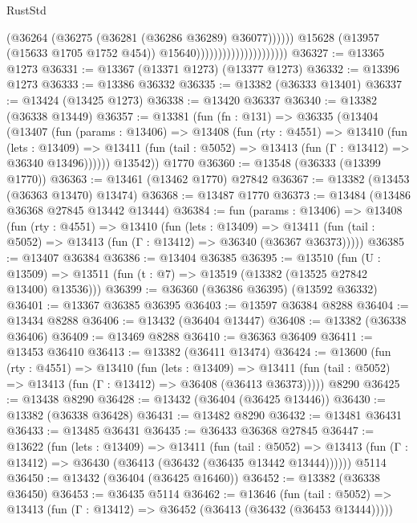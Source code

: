 \begin{lexlean}{RustStd}
\begin{coremodule}
                                                    (@36264
                                                      (@36275 (@36281 (@36286 @36289) @36077))))))
                                              @15628
                                              (@13957 (@15633 @1705 @1752 @454))
                                              @15640)))))))))))))))))))))
@36327 := @13365 @1273
@36331 := @13367 (@13371 @1273) (@13377 @1273)
@36332 := @13396 @1273
@36333 := @13386 @36332
@36335 := @13382 (@36333 @13401)
@36337 := @13424 (@13425 @1273)
@36338 := @13420 @36337
@36340 := @13382 (@36338 @13449)
@36357 := @13381
    (fun (fn : @131) =>
    @36335
      (@13404
        (@13407
          (fun (params : @13406) =>
          @13408
            (fun (rty : @4551) =>
            @13410
              (fun (lets : @13409) =>
              @13411 (fun (tail : @5052) => @13413 (fun (Γ : @13412) => @36340 @13496))))))
        @13542))
    @1770
@36360 := @13548 (@36333 (@13399 @1770))
@36363 := @13461 (@13462 @1770) @27842
@36367 := @13382 (@13453 (@36363 @13470) @13474)
@36368 := @13487 @1770
@36373 := @13484 (@13486 @36368 @27845 @13442 @13444)
@36384 := fun (params : @13406) =>
  @13408
    (fun (rty : @4551) =>
    @13410
      (fun (lets : @13409) =>
      @13411 (fun (tail : @5052) => @13413 (fun (Γ : @13412) => @36340 (@36367 @36373)))))
@36385 := @13407 @36384
@36386 := @13404 @36385
@36395 := @13510
    (fun (U : @13509) => @13511 (fun (t : @7) => @13519 (@13382 (@13525 @27842 @13400) @13536)))
@36399 := @36360 (@36386 @36395) (@13592 @36332)
@36401 := @13367 @36385 @36395
@36403 := @13597 @36384 @8288
@36404 := @13434 @8288
@36406 := @13432 (@36404 @13447)
@36408 := @13382 (@36338 @36406)
@36409 := @13469 @8288
@36410 := @36363 @36409
@36411 := @13453 @36410
@36413 := @13382 (@36411 @13474)
@36424 := @13600
    (fun (rty : @4551) =>
    @13410
      (fun (lets : @13409) =>
      @13411 (fun (tail : @5052) => @13413 (fun (Γ : @13412) => @36408 (@36413 @36373)))))
    @8290
@36425 := @13438 @8290
@36428 := @13432 (@36404 (@36425 @13446))
@36430 := @13382 (@36338 @36428)
@36431 := @13482 @8290
@36432 := @13481 @36431
@36433 := @13485 @36431
@36435 := @36433 @36368 @27845
@36447 := @13622
    (fun (lets : @13409) =>
    @13411
      (fun (tail : @5052) =>
      @13413 (fun (Γ : @13412) => @36430 (@36413 (@36432 (@36435 @13442 @13444))))))
    @5114
@36450 := @13432 (@36404 (@36425 @16460))
@36452 := @13382 (@36338 @36450)
@36453 := @36435 @5114
@36462 := @13646
    (fun (tail : @5052) => @13413 (fun (Γ : @13412) => @36452 (@36413 (@36432 (@36453 @13444)))))

\end{coremodule}
\end{lexlean}
